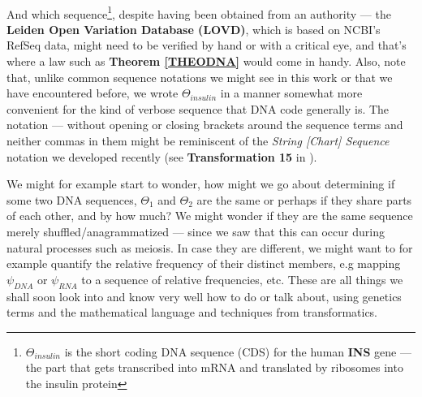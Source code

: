 \documentclass[a4paper, 18pt]{book} %
\begin{document}
\\

And which sequence\footnote{$\Theta_{insulin}$ is the short coding DNA sequence (CDS) for the human \textbf{INS} gene --- the part that gets transcribed into mRNA and translated by ribosomes into the insulin protein\cite{copilot_dna_assistant}}, despite having been obtained from an authority --- the \textbf{Leiden Open Variation Database (LOVD)}, which is based on NCBI's RefSeq data\cite{RefSeq}, might need to be verified by hand or with a critical eye, and that's where a law such as \textbf{Theorem \ref{THEODNA}} would come in handy. Also, note that, unlike common sequence notations we might see in this work or that we have encountered before, we wrote $\Theta_{insulin}$ in a manner somewhat more convenient for the kind of verbose sequence that DNA code generally is. The notation --- without opening or closing brackets around the sequence terms and neither commas in them might be reminiscent of the \textit{String [Chart] Sequence} notation we developed recently (see \textbf{Transformation 15} in \cite{transformatics}).

We might for example start to wonder, how might we go about determining if some two DNA sequences, $\Theta_1$ and $\Theta_2$ are the same or perhaps if they share parts of each other, and by how much? We might wonder if they are the same sequence merely shuffled/anagrammatized --- since we saw that this can occur during natural processes such as meiosis\cite{genomics2025origin}. In case they are different, we might want to for example quantify the relative frequency of their distinct members, e.g mapping $\psi_{DNA}$ or $\psi_{RNA}$ to a sequence of relative frequencies, etc. These are all things we shall soon look into and know very well how to do or talk about, using genetics terms and the mathematical language and techniques from transformatics.
\end{document}
